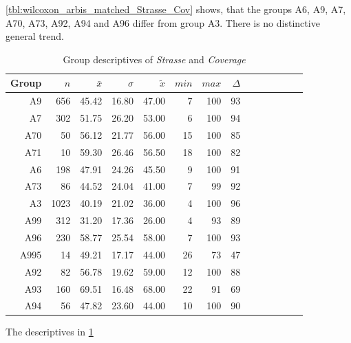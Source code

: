 \cref{tbl:wilcoxon_arbis_matched_Strasse_Cov} shows, that the groups A6, A9, A7, A70, A73, A92, A94 and A96 differ from group A3. There is no distinctive general trend.
\begin{table}[ht!]
	\tiny
	\centering
	\begin{tabular}{rrrrrrrrrrrrrr}
		\toprule
		Group & $n$ & $\bar{x}$ & $\sigma$ & $\tilde{x}$ & $min$ & $max$ & $\Delta$ \\
		\midrule
		A9   & 656  & 45.42 & 16.80 & 47.00 & 7  & 100 & 93 \\ 
		A7   & 302  & 51.75 & 26.20 & 53.00 & 6  & 100 & 94 \\ 
		A70  & 50   & 56.12 & 21.77 & 56.00 & 15 & 100 & 85 \\ 
		A71  & 10   & 59.30 & 26.46 & 56.50 & 18 & 100 & 82 \\ 
		A6   & 198  & 47.91 & 24.26 & 45.50 & 9  & 100 & 91 \\ 
		A73  & 86   & 44.52 & 24.04 & 41.00 & 7  & 99  & 92 \\ 
		A3   & 1023 & 40.19 & 21.02 & 36.00 & 4  & 100 & 96 \\ 
		A99  & 312  & 31.20 & 17.36 & 26.00 & 4  & 93  & 89 \\ 
		A96  & 230  & 58.77 & 25.54 & 58.00 & 7  & 100 & 93 \\ 
		A995 & 14   & 49.21 & 17.17 & 44.00 & 26 & 73  & 47 \\ 
		A92  & 82   & 56.78 & 19.62 & 59.00 & 12 & 100 & 88 \\ 
		A93  & 160  & 69.51 & 16.48 & 68.00 & 22 & 91  & 69 \\ 
		A94  & 56   & 47.82 & 23.60 & 44.00 & 10 & 100 & 90 \\ 
		\bottomrule
	\end{tabular}
	\caption{Group descriptives of \textit{Strasse} and \textit{Coverage}}
	\label{tbl:descriptives_arbis_matched_Strasse_Cov}
\end{table}
The descriptives in \cref{tbl:descriptives_arbis_matched_Strasse_Cov}

